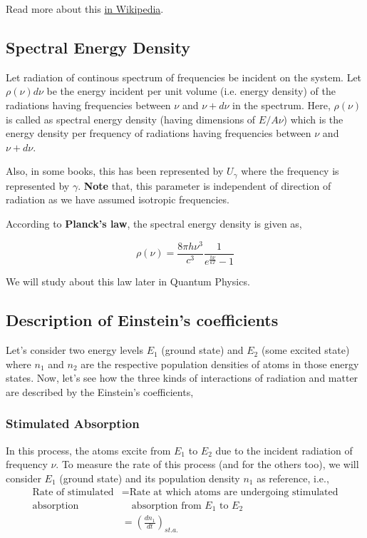 \documentclass[12pt]{article}
\begin{document}
Read more about this \href{https://en.wikipedia.org/wiki/Einstein_coefficients}{in Wikipedia}.

\subsection{Spectral Energy Density}

Let radiation of continous spectrum of frequencies be incident on the system. Let $\rho(\nu)d\nu$ be the energy incident per unit volume (i.e. energy density) of the radiations having frequencies between $\nu$ and $\nu + d\nu$ in the spectrum. Here, $\rho(\nu)$ is called as spectral energy density (having dimensions of $E/A\nu$) which is the energy density per frequency of radiations having frequencies between $\nu$ and $\nu + d\nu$. \vspace{.2cm}

Also, in some books, this has been represented by $U_{\gamma}$ where the frequency is represented by $\gamma$. \textbf{Note} that, this parameter is independent of direction of radiation as we have assumed isotropic frequencies. \vspace{.2cm}

According to \textbf{Planck's law}, the spectral energy density is given as,

\begin{equation}
    \rho(\nu) = \frac{8\pi h\nu^3}{c^3} \frac{1}{e^\frac{h\nu}{kT} - 1}
\end{equation}

We will study about this law later in Quantum Physics.

\subsection{Description of Einstein's coefficients}

Let's consider two energy levels $E_{1}$ (ground state) and $E_{2}$ (some excited state) where $n_{1}$ and $n_{2}$ are the respective population densities of atoms in those energy states. Now, let's see how the three kinds of interactions of radiation and matter are described by the Einstein's coefficients,

\subsubsection{Stimulated Absorption}

In this process, the atoms excite from $E_{1}$ to $E_{2}$ due to the incident radiation of frequency $\nu$. To measure the rate of this process (and for the others too), we will consider $E_{1}$ (ground state) and its population density $n_{1}$ as reference, i.e.,
\begin{align*}
    \text{Rate of stimulated} & = \text{Rate at which atoms are undergoing stimulated} \\
    \text{absorption} & \quad \text{absorption from } E_{1} \text{ to } E_{2} \\ 
    & = (\frac{dn_{1}}{dt})_{st.a.}
\end{align*}
\end{document}
